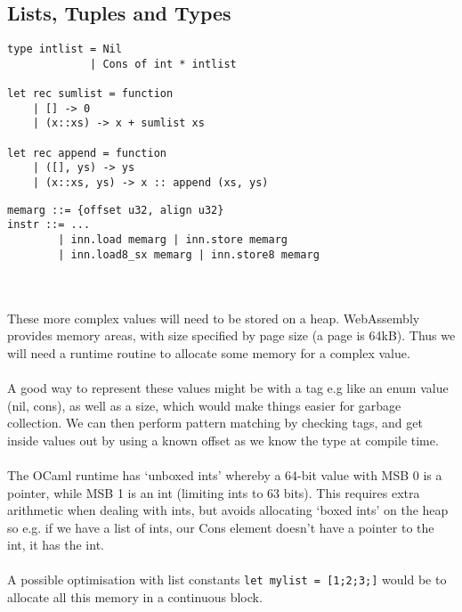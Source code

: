 \documentclass{report}
\newcommand{\camlinline}{\texttt}
\begin{document}
\subsection{Lists, Tuples and Types}
\begin{minipage}{0.5\linewidth}
\begin{verbatim}
type intlist = Nil
             | Cons of int * intlist
             
let rec sumlist = function
    | [] -> 0
    | (x::xs) -> x + sumlist xs
    
let rec append = function
    | ([], ys) -> ys
    | (x::xs, ys) -> x :: append (xs, ys)
\end{verbatim}
\end{minipage}  
\begin{minipage}{0.5\linewidth}
\begin{verbatim}    
memarg ::= {offset u32, align u32}
instr ::= ...
        | inn.load memarg | inn.store memarg
        | inn.load8_sx memarg | inn.store8 memarg
\end{verbatim}
\end{minipage}
\\\\
These more complex values will need to be stored on a heap. WebAssembly provides memory areas, with size specified by page size (a page is 64kB). Thus we will need a runtime routine to allocate some memory for a complex value.
\\\\
A good way to represent these values might be with a tag e.g like an enum value (nil, cons), as well as a size, which would make things easier for garbage collection. We can then perform pattern matching by checking tags, and get inside values out by using a known offset as we know the type at compile time.
\\\\
The OCaml runtime has `unboxed ints' whereby a 64-bit value with MSB 0 is a pointer, while MSB 1 is an int (limiting ints to 63 bits). This requires extra arithmetic when dealing with ints, but avoids allocating `boxed ints' on the heap so e.g. if we have a list of ints, our Cons element doesn't have a pointer to the int, it has the int.
\\\\
A possible optimisation with list constants \camlinline{let mylist = [1;2;3;]} would be to allocate all this memory in a continuous block.
\end{document}
